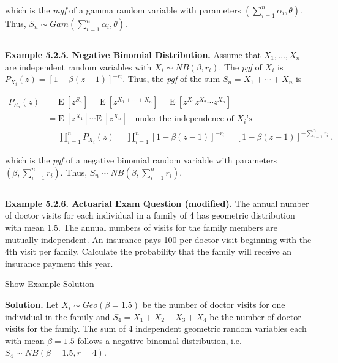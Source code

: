 \documentclass[]{book}
\theoremstyle{definition}
\theoremstyle{definition}
\theoremstyle{definition}
\theoremstyle{remark}
\begin{document}
which is the \emph{mgf} of a gamma random variable with parameters
\((\sum_{i=1}^n \alpha_i, \theta)\). Thus,
\(S_n \sim Gam(\sum_{i=1}^n \alpha_i, \theta)\).

\begin{center}\rule{0.5\linewidth}{\linethickness}\end{center}

\textbf{Example 5.2.5. Negative Binomial Distribution.} Assume that
\(X_1,\ldots, X_n\) are independent random variables with
\(X_i \sim NB(\beta, r_i)\). The \emph{pgf} of \(X_i\) is
\(P_{X_i}(z) = \left[1-\beta(z-1) \right]^{-r_i}\). Thus, the \emph{pgf}
of the sum \(S_n =X_1+\cdots+X_n\) is

\[\begin{aligned}
P_{S_n}(z) &= \mathrm{E~}\left[ z^{S_n} \right] = \mathrm{E~}\left[ z^{X_1+\cdots+X_n} \right] = \mathrm{E~}\left[ z^{X_1} z^{X_2} \cdots z^{X_n} \right] \\
&= \mathrm{E~}\left[z^{X_1}\right] \cdots \mathrm{E~}\left[z^{X_n}\right] ~~~~ \text{under the independence of } X_i \text{'s} \\
&= \prod_{i=1}^n P_{X_i}(z) = \prod_{i=1}^n \left[1-\beta(z-1) \right]^{-r_i} = \left[1-\beta(z-1) \right]^{-\sum_{i=1}^n r_i} ~,
\end{aligned}\]

which is the \emph{pgf} of a negative binomial random variable with
parameters \((\beta, \sum_{i=1}^n r_i)\). Thus,
\(S_n \sim NB(\beta, \sum_{i=1}^n r_i)\).

\begin{center}\rule{0.5\linewidth}{\linethickness}\end{center}

\textbf{Example 5.2.6. Actuarial Exam Question (modified).} The annual
number of doctor visits for each individual in a family of 4 has
geometric distribution with mean 1.5. The annual numbers of visits for
the family members are mutually independent. An insurance pays 100 per
doctor visit beginning with the 4th visit per family. Calculate the
probability that the family will receive an insurance payment this year.

Show Example Solution

\hypertarget{toggleExampleAggLoss.2.6}{}
\textbf{Solution.} Let \(X_i \sim Geo(\beta=1.5)\) be the number of
doctor visits for one individual in the family and
\(S_4 = X_1 + X_2 + X_3 + X_4\) be the number of doctor visits for the
family. The sum of 4 independent geometric random variables each with
mean \(\beta=1.5\) follows a negative binomial distribution, i.e.
\(S_4 \sim NB(\beta=1.5, r=4)\).
\end{document}
